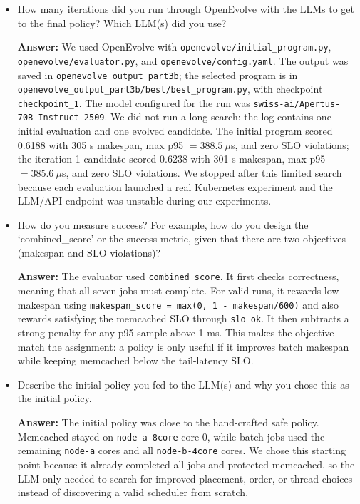 \begin{enumerate}
\begin{enumerate}
        \begin{itemize}
            \item How many iterations did you run through OpenEvolve with the LLMs to get to the final policy? Which LLM(s) did you use?

            \textbf{Answer:} We used OpenEvolve with \texttt{openevolve/initial\_program.py}, \texttt{openevolve/evaluator.py}, and \texttt{openevolve/config.yaml}. The output was saved in \texttt{openevolve\_output\_part3b}; the selected program is in \texttt{openevolve\_output\_part3b/best/best\_program.py}, with checkpoint \texttt{checkpoint\_1}. The model configured for the run was \texttt{swiss-ai/Apertus-70B-Instruct-2509}. We did not run a long search: the log contains one initial evaluation and one evolved candidate. The initial program scored 0.6188 with 305 s makespan, max p95 $=388.5~\mu$s, and zero SLO violations; the iteration-1 candidate scored 0.6238 with 301 s makespan, max p95 $=385.6~\mu$s, and zero SLO violations. We stopped after this limited search because each evaluation launched a real Kubernetes experiment and the LLM/API endpoint was unstable during our experiments.

            \item How do you measure success? For example, how do you design the `combined\_score' or the success metric, given that there are two objectives (makespan and SLO violations)?

            \textbf{Answer:} The evaluator used \texttt{combined\_score}. It first checks correctness, meaning that all seven jobs must complete. For valid runs, it rewards low makespan using \texttt{makespan\_score = max(0, 1 - makespan/600)} and also rewards satisfying the memcached SLO through \texttt{slo\_ok}. It then subtracts a strong penalty for any p95 sample above 1 ms. This makes the objective match the assignment: a policy is only useful if it improves batch makespan while keeping memcached below the tail-latency SLO.

            \item Describe the initial policy you fed to the LLM(s) and why you chose this as the initial policy.

            \textbf{Answer:} The initial policy was close to the hand-crafted safe policy. Memcached stayed on \texttt{node-a-8core} core 0, while batch jobs used the remaining \texttt{node-a} cores and all \texttt{node-b-4core} cores. We chose this starting point because it already completed all jobs and protected memcached, so the LLM only needed to search for improved placement, order, or thread choices instead of discovering a valid scheduler from scratch.


\end{itemize}
\end{enumerate}
\end{enumerate}
